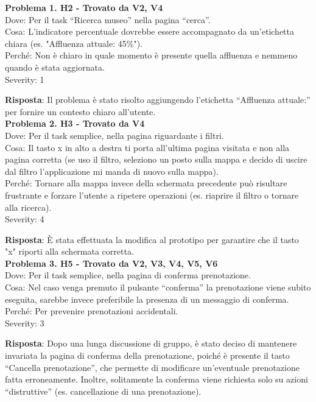 \documentclass{article}
\begin{document}
\noindent \textbf{Problema 1. H2 - Trovato da V2, V4} \\
Dove: Per il task “Ricerca museo” nella pagina “cerca”. \\
Cosa: L’indicatore percentuale dovrebbe essere accompagnato da un'etichetta chiara (es. "Affluenza attuale: 45\%"). \\
Perché: Non è chiaro in quale momento è presente quella affluenza e nemmeno quando è stata aggiornata. \\
Severity: 1

\noindent \textbf{Risposta}: Il problema è stato risolto aggiungendo l’etichetta “Affluenza attuale:” per fornire un contesto chiaro all’utente.\\

\noindent \textbf{Problema 2. H3 - Trovato da V4} \\
Dove: Per il task semplice, nella pagina riguardante i filtri. \\
Cosa: Il tasto x in alto a destra ti porta all’ultima pagina visitata e non alla pagina corretta (se uso il filtro, seleziono un posto sulla mappa e decido di uscire dal filtro l’applicazione mi manda di nuovo sulla mappa). \\
Perché: Tornare alla mappa invece della schermata precedente può risultare frustrante e forzare l’utente a ripetere operazioni (es. riaprire il filtro o tornare alla ricerca). \\
Severity: 4

\noindent \textbf{Risposta}: È stata effettuata la modifica al prototipo per garantire che il tasto "x" riporti alla schermata corretta.\\

\noindent \textbf{Problema 3. H5 - Trovato da V2, V3, V4, V5, V6} \\
Dove: Per il task semplice, nella pagina di conferma prenotazione. \\
Cosa: Nel caso venga premuto il pulsante “conferma” la prenotazione viene subito eseguita, sarebbe invece preferibile la presenza di un messaggio di conferma. \\
Perché: Per prevenire prenotazioni accidentali. \\
Severity: 3

\noindent \textbf{Risposta}: Dopo una lunga discussione di gruppo, è stato deciso di mantenere invariata la pagina di conferma della prenotazione, poiché è presente il tasto “Cancella prenotazione”, che permette di modificare un’eventuale prenotazione fatta erroneamente. Inoltre, solitamente la conferma viene richiesta solo su azioni “distruttive” (es. cancellazione di una prenotazione).\\
\end{document}
